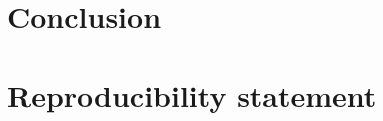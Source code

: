 \documentclass{article} %
\begin{document}
\section{Conclusion}
\vspace{-0.8em}


\vspace{-0.8em}
\section*{Reproducibility statement}
\vspace{-0.8em}










\end{document}
